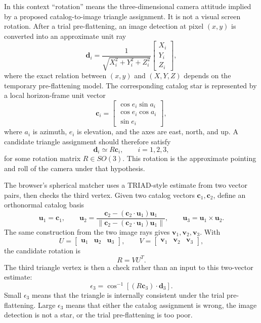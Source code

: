 \documentclass[11pt]{article}
\begin{document}
In this context ``rotation'' means the three-dimensional camera attitude
implied by a proposed catalog-to-image triangle assignment. It is not a visual
screen rotation. After a trial pre-flattening, an image detection at pixel
\((x,y)\) is converted into an approximate unit ray
\[
  \mathbf{d}_i =
  \frac{1}{\sqrt{X_i^2+Y_i^2+Z_i^2}}
  \begin{bmatrix} X_i \\ Y_i \\ Z_i \end{bmatrix},
\]
where the exact relation between \((x,y)\) and \((X,Y,Z)\) depends on the
temporary pre-flattening model. The corresponding catalog star is represented
by a local horizon-frame unit vector
\[
  \mathbf{c}_i =
  \begin{bmatrix}
    \cos e_i \sin a_i \\
    \cos e_i \cos a_i \\
    \sin e_i
  \end{bmatrix},
\]
where \(a_i\) is azimuth, \(e_i\) is elevation, and the axes are east, north,
and up. A candidate triangle assignment should therefore satisfy
\[
  \mathbf{d}_i \simeq R \mathbf{c}_i,
  \qquad i=1,2,3,
\]
for some rotation matrix \(R\in SO(3)\). This rotation is the approximate
pointing and roll of the camera under that hypothesis.

The browser's spherical matcher uses a TRIAD-style estimate from two vector
pairs, then checks the third vertex. Given two catalog vectors
\(\mathbf{c}_1,\mathbf{c}_2\), define an orthonormal catalog basis
\[
  \mathbf{u}_1 = \mathbf{c}_1,\qquad
  \mathbf{u}_2 =
  \frac{\mathbf{c}_2-(\mathbf{c}_2\cdot\mathbf{u}_1)\mathbf{u}_1}
       {\left\|\mathbf{c}_2-(\mathbf{c}_2\cdot\mathbf{u}_1)\mathbf{u}_1\right\|},
  \qquad
  \mathbf{u}_3 = \mathbf{u}_1 \times \mathbf{u}_2 .
\]
The same construction from the two image rays gives
\(\mathbf{v}_1,\mathbf{v}_2,\mathbf{v}_3\). With
\[
  U = \begin{bmatrix}\mathbf{u}_1&\mathbf{u}_2&\mathbf{u}_3\end{bmatrix},
  \qquad
  V = \begin{bmatrix}\mathbf{v}_1&\mathbf{v}_2&\mathbf{v}_3\end{bmatrix},
\]
the candidate rotation is
\[
  R = VU^T .
\]
The third triangle vertex is then a check rather than an input to this
two-vector estimate:
\[
  \epsilon_3 =
  \cos^{-1}\!\left[
    \left(R\mathbf{c}_3\right)\cdot \mathbf{d}_3
  \right].
\]
Small \(\epsilon_3\) means that the triangle is internally consistent under
the trial pre-flattening. Large \(\epsilon_3\) means that either the catalog
assignment is wrong, the image detection is not a star, or the trial
pre-flattening is too poor.
\end{document}

